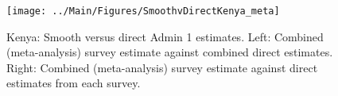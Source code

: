 \documentclass[12pt]{article}\usepackage[]{graphicx}\usepackage[]{color}
\newenvironment{knitrout}{}{} %
\begin{document}

\begin{knitrout}
\color{fgcolor}\begin{figure}[bht]

{\centering \texttt{[image: ../Main/Figures/SmoothvDirectKenya\_meta]} 

}

\caption[Kenya]{Kenya: Smooth versus direct Admin 1 estimates. Left: Combined (meta-analysis) survey estimate against combined direct estimates. Right: Combined (meta-analysis) survey estimate against direct estimates from each survey.}\label{fig:unnamed-chunk-163}
\end{figure}


\end{knitrout}
\end{document}

